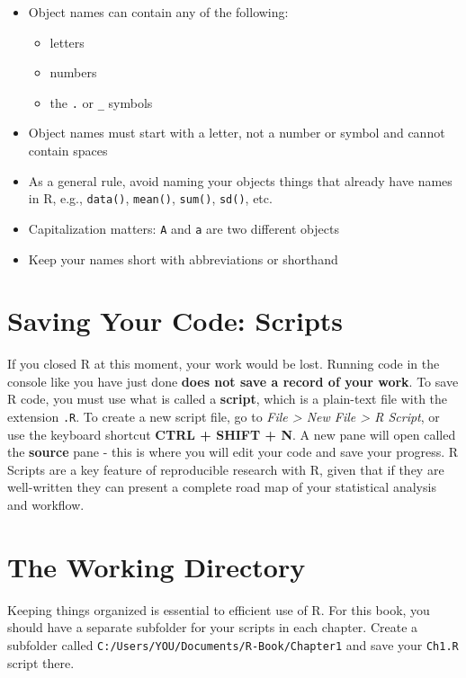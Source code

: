 \documentclass[]{book}
\providecommand{\tightlist}{%
  \setlength{\itemsep}{0pt}\setlength{\parskip}{0pt}}
\begin{document}
\begin{itemize}
\tightlist
\item
  Object names can contain any of the following:

  \begin{itemize}
  \tightlist
  \item
    letters
  \item
    numbers
  \item
    the \texttt{.} or \texttt{\_} symbols
  \end{itemize}
\item
  Object names must start with a letter, not a number or symbol and cannot contain spaces
\item
  As a general rule, avoid naming your objects things that already have names in R, e.g., \texttt{data()}, \texttt{mean()}, \texttt{sum()}, \texttt{sd()}, etc.
\item
  Capitalization matters: \texttt{A} and \texttt{a} are two different objects
\item
  Keep your names short with abbreviations or shorthand
\end{itemize}

\hypertarget{scripts}{%
\section{Saving Your Code: Scripts}\label{scripts}}

If you closed R at this moment, your work would be lost. Running code in the console like you have just done \textbf{does not save a record of your work}. To save R code, you must use what is called a \textbf{script}, which is a plain-text file with the extension \texttt{.R}. To create a new script file, go to \emph{File \textgreater{} New File \textgreater{} R Script}, or use the keyboard shortcut \textbf{CTRL + SHIFT + N}. A new pane will open called the \textbf{source} pane - this is where you will edit your code and save your progress. R Scripts are a key feature of reproducible research with R, given that if they are well-written they can present a complete road map of your statistical analysis and workflow.

\hypertarget{working-dir}{%
\section{The Working Directory}\label{working-dir}}

Keeping things organized is essential to efficient use of R. For this book, you should have a separate subfolder for your scripts in each chapter. Create a subfolder called \texttt{C:/Users/YOU/Documents/R-Book/Chapter1} and save your \texttt{Ch1.R} script there.
\end{document}
